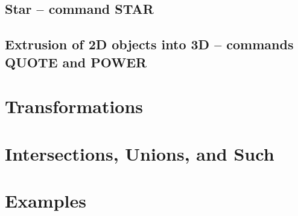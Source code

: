 \documentclass[article,A4,12pt]{llncs}
\begin{document}
\subsection{Star -- command STAR}



\subsection{Extrusion of 2D objects into 3D -- commands QUOTE and POWER}





\section{Transformations}





\section{Intersections, Unions, and Such}




\section{Examples}
\end{document}
